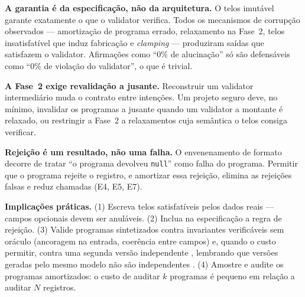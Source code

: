 \documentclass[sigconf,nonacm]{acmart}
\begin{document}
\textbf{A garantia é da especificação, não da arquitetura.} O telos imutável garante exatamente o que o validator verifica. Todos os mecanismos de corrupção observados --- amortização de programa errado, relaxamento na Fase~2, telos insatisfatível que induz fabricação e \textit{clamping} --- produziram saídas que satisfazem o validator. Afirmações como ``0\% de alucinação'' só são defensáveis como ``0\% de violação do validator'', o que é trivial.

\textbf{A Fase~2 exige revalidação a jusante.} Reconstruir um validator intermediário muda o contrato entre intenções. Um projeto seguro deve, no mínimo, invalidar os programas a jusante quando um validator a montante é relaxado, ou restringir a Fase~2 a relaxamentos cuja semântica o telos consiga verificar.

\textbf{Rejeição é um resultado, não uma falha.} O envenenamento de formato decorre de tratar ``o programa devolveu \texttt{null}'' como falha do programa. Permitir que o programa rejeite o registro, e amortizar essa rejeição, elimina as rejeições falsas e reduz chamadas (E4, E5, E7).

\textbf{Implicações práticas.} (1) Escreva telos satisfatíveis pelos dados reais --- campos opcionais devem ser anuláveis. (2) Inclua na especificação a regra de rejeição. (3) Valide programas sintetizados contra invariantes verificáveis sem oráculo (ancoragem na entrada, coerência entre campos) e, quando o custo permitir, contra uma segunda versão independente \cite{avizienis1985nversion}, lembrando que versões geradas pelo mesmo modelo não são independentes \cite{knight1986experimental}. (4) Amostre e audite os programas amortizados: o custo de auditar $k$ programas é pequeno em relação a auditar $N$ registros.
\end{document}
